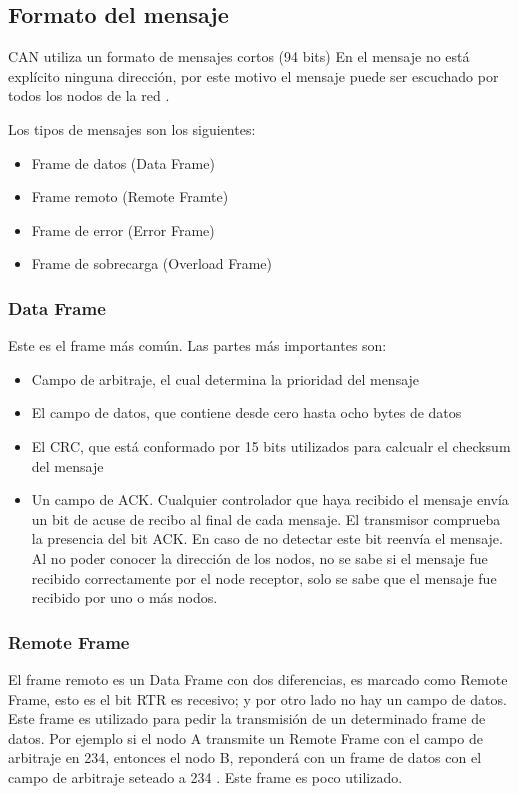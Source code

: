 \subsection{Formato del mensaje}
CAN utiliza un formato de mensajes cortos (94 bits) En el mensaje no está explícito ninguna dirección, por este motivo el mensaje puede ser escuchado por todos los nodos de la red \citep{kvaserWEB}.

Los tipos de mensajes son los siguientes:
\begin{itemize}
    \item Frame de datos (Data Frame)
    \item Frame remoto (Remote Framte)
    \item Frame de error (Error Frame)
    \item Frame de sobrecarga (Overload Frame)
\end{itemize}

\subsubsection{Data Frame}
Este es el frame más común. Las partes más importantes son:

\begin{itemize}
\item Campo de arbitraje, el cual determina la prioridad del mensaje
\item El campo de datos, que contiene desde cero hasta ocho bytes de datos
\item El CRC, que está conformado por 15 bits utilizados para calcualr el checksum del mensaje
\item Un campo de ACK. Cualquier controlador que haya recibido el mensaje envía un bit de acuse de recibo al final de cada mensaje. El transmisor comprueba la presencia del bit ACK. En caso de no detectar este bit reenvía el mensaje. Al no poder conocer la dirección de los nodos, no se sabe si el mensaje fue recibido correctamente por el node receptor, solo se sabe que el mensaje fue recibido por uno o más nodos.   
\end{itemize}

\subsubsection{Remote Frame}
El frame remoto es un Data Frame con dos diferencias, es marcado como Remote Frame, esto es el bit RTR es recesivo; y por otro lado no hay un campo de datos. Este frame es utilizado para pedir la transmisión de un determinado frame de datos. Por ejemplo si el nodo A transmite un Remote Frame con el campo de arbitraje en 234, entonces el nodo B, reponderá con un frame de datos con el campo de arbitraje seteado a 234 \citep{kvaserWEB}. Este frame es poco utilizado.

